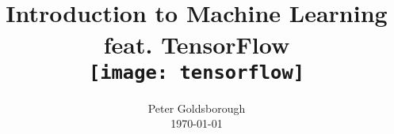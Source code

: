 





\begin{frame}[plain]
    \title{
      \vspace{1.2cm}\\
      Introduction to Machine Learning\\
      feat. TensorFlow\\
      \vspace{1cm}
      \texttt{[image: tensorflow]}}
    \author{
      Peter Goldsborough \\
      \vspace{0.5cm}
      \today
    }
    \titlepage
\end{frame}







% 
% 







